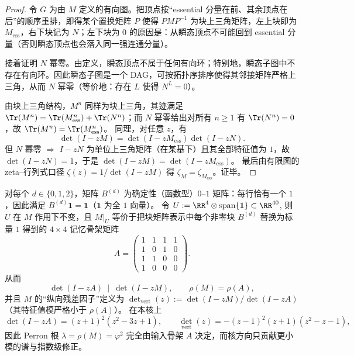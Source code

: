 \begin{proof}
令 $G$ 为由 $M$ 定义的有向图。把顶点按“essential 分量在前、其余顶点在后”的顺序重排，即得某个置换矩阵 $P$ 使得 $PMP^{-1}$ 为块上三角矩阵，左上块即为 $M_{\mathrm{ess}}$，右下块记为 $N$；左下块为 $0$ 的原因是：从瞬态顶点不可能回到 essential 分量（否则瞬态顶点也会落入同一强连通分量）。

接着证明 $N$ 幂零。由定义，瞬态顶点不属于任何有向环；特别地，瞬态子图中不存在有向环。因此瞬态子图是一个 DAG，可按拓扑序排序使得其邻接矩阵严格上三角，从而 $N$ 幂零（等价地：存在 $L$ 使得 $N^L=0$）。

由块上三角结构，$M^n$ 同样为块上三角，其迹满足
\(
\Tr(M^n)=\Tr(M_{\mathrm{ess}}^n)+\Tr(N^n)
\)；而 $N$ 幂零给出对所有 $n\ge 1$ 有 $\Tr(N^n)=0$，故 $\Tr(M^n)=\Tr(M_{\mathrm{ess}}^n)$。
同理，对任意 $z$，有
\[
\det(I-zM)=\det(I-zM_{\mathrm{ess}})\det(I-zN).
\]
但 $N$ 幂零 $\Rightarrow$ $I-zN$ 为单位上三角矩阵（在某基下）且其全部特征值为 $1$，故 $\det(I-zN)=1$，于是 $\det(I-zM)=\det(I-zM_{\mathrm{ess}})$。
最后由有限图的 zeta--行列式口径 $\zeta(z)=1/\det(I-zM)$ 得 $\zeta_M=\zeta_{M_{\mathrm{ess}}}$。证毕。
\end{proof}

\begin{proposition}[确定性分块扩张的输入骨架因子]\label{prop:real-input-40-skeleton-factor}
对每个 $d\in\{0,1,2\}$，矩阵 $B^{(d)}$ 为确定性（函数型）$0$--$1$ 矩阵：每行恰有一个 $1$，因此满足 $B^{(d)}\mathbf{1}=\mathbf{1}$（$\mathbf{1}$ 为全 $1$ 向量）。
令
\(
U:=\RR^{4}\otimes \mathrm{span}\{\mathbf{1}\}\subset\RR^{40}
\),
则 $U$ 在 $M$ 作用下不变，且 $M|_U$ 等价于把块矩阵表示中每个非零块 $B^{(d)}$ 替换为标量 $1$ 得到的 $4\times 4$ 记忆骨架矩阵
\[
A=\begin{pmatrix}
1&1&1&1\\
1&0&1&0\\
1&1&0&0\\
1&0&0&0
\end{pmatrix}.
\]
从而
\[
\det(I-zA)\ \mid\ \det(I-zM),
\qquad
\rho(M)=\rho(A),
\]
并且 $M$ 的“纵向残差因子”定义为
\(
\det_{\mathrm{vert}}(z):=\det(I-zM)/\det(I-zA)
\)
（其特征值模严格小于 $\rho(A)$）。
在本核上
\[
\det(I-zA)=(z+1)^2(z^2-3z+1),
\qquad
\det_{\mathrm{vert}}(z)=-(z-1)^2(z+1)(z^2-z-1),
\]
因此 Perron 根 $\lambda=\rho(M)=\varphi^2$ 完全由输入骨架 $A$ 决定，而核方向只贡献更小模的谱与指数级修正。
\end{proposition}


